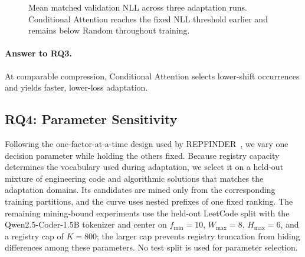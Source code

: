 \begin{figure}[!t]
  \centering
  \vspace{-5pt}
  \caption{Mean matched validation NLL across three adaptation runs. Conditional Attention reaches the fixed NLL threshold earlier and remains below Random throughout training.}
  \label{fig:conditional_attention_convergence}
\end{figure}

\paragraph{Answer to RQ3.} At comparable compression, Conditional Attention selects lower-shift occurrences and yields faster, lower-loss adaptation.

\subsection{RQ4: Parameter Sensitivity}
\label{subsec:sensitivity}

Following the one-factor-at-a-time design used by REPFINDER~\cite{repfinder2021}, we vary one decision parameter while holding the others fixed. Because registry capacity determines the vocabulary used during adaptation, we select it on a held-out mixture of engineering code and algorithmic solutions that matches the adaptation domains. Its candidates are mined only from the corresponding training partitions, and the curve uses nested prefixes of one fixed ranking. The remaining mining-bound experiments use the held-out LeetCode split with the Qwen2.5-Coder-1.5B tokenizer and center on $f_{\min}=10$, $W_{\max}=8$, $H_{\max}=6$, and a registry cap of $K=800$; the larger cap prevents registry truncation from hiding differences among these parameters. No test split is used for parameter selection.

